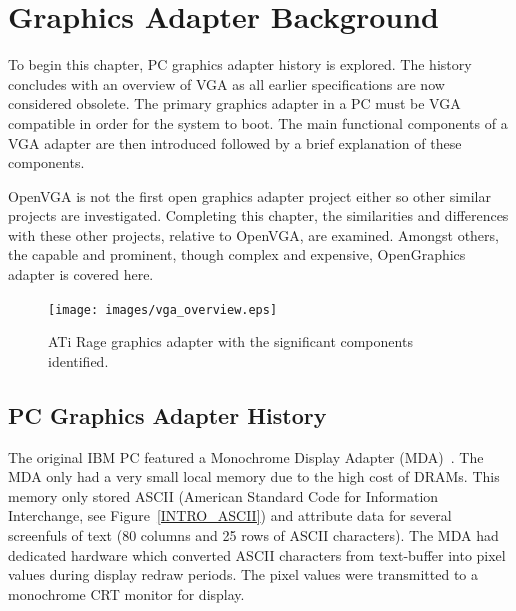 \chapter{Graphics Adapter Background}
\label{BACKGROUND}

To begin this chapter, PC graphics adapter history is explored. The history
concludes with an overview of VGA as all earlier specifications are now
considered obsolete. The primary graphics adapter in a PC must be VGA compatible
in order for the system to boot. The main functional components of a VGA adapter
are then introduced followed by a brief explanation of these components.

OpenVGA is not the first open graphics adapter project either so other
similar projects are investigated. Completing this chapter, the similarities and
differences with these other projects, relative to OpenVGA, are examined. Amongst
others, the capable and prominent, though complex and expensive, OpenGraphics
adapter is covered here.


\begin{figure}[h!]
\begin{center}
\texttt{[image: images/vga\_overview.eps]}
\caption[ATi Rage graphics adpater]{ATi Rage graphics adapter with the
significant components identified.}
\end{center}
\label{INTRO_ATi_Rage}
\end{figure}


\section{PC Graphics Adapter History}
The original IBM PC featured a Monochrome Display Adapter (MDA)~\cite{VGA_Programmers}. The MDA
only had a very small local memory due to the high cost of DRAMs. This memory
only stored ASCII (American Standard Code for Information
Interchange, see Figure~\ref{INTRO_ASCII}) and attribute data for
several screenfuls of text (80 columns and 25 rows of ASCII characters). The MDA
had dedicated hardware which converted ASCII characters from text-buffer into
pixel values during display redraw periods. The pixel values were transmitted to
a monochrome CRT monitor for
display.

